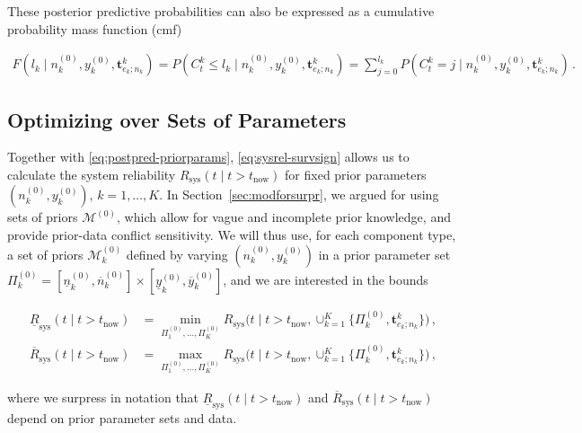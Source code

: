 \documentclass[Journal,SectionNumbers,SingleSpace,InsideFigs]{ascelike}
\renewcommand{\vec}[1]{{\bm#1}}
\newcommand{\uz}{^{(0)}} %
\newcommand{\un}{^{(n)}} %
\newcommand{\ul}[1]{\underline{#1}}
\newcommand{\ol}[1]{\overline{#1}}
\newcommand{\Rsys}{R_\text{sys}}
\newcommand{\lRsys}{\ul{R}_\text{sys}}
\newcommand{\uRsys}{\ol{R}_\text{sys}}
\def\Rsys{R_\text{sys}}
\def\ykz{y\uz_k}
\def\ykzl{\ul{y}\uz_k}
\def\ykzu{\ol{y}\uz_k}
\def\nkz{n\uz_k}
\def\nkn{n\un_k}
\def\nkzl{\ul{n}\uz_k}
\def\nkzu{\ol{n}\uz_k}
\def\MZ{\mathcal{M}\uz}
\def\MkZ{\mathcal{M}\uz_k}
\def\PkZ{\Pi\uz_k}
\newcommand{\PZi}[1]{\Pi\uz_{#1}}
\def\tnow{t_\text{now}}
\begin{document}
%
These posterior predictive probabilities can also be expressed as a cumulative probability mass function (cmf) 
\begin{linenomath*}
\begin{align}
F(l_k \mid \nkz,\ykz,\vec{t}^k_{e_k;n_k}) = P(C^k_t \leq l_k \mid \nkz,\ykz,\vec{t}^k_{e_k;n_k}) 
 = \sum_{j=0}^{l_k} P(C^k_t = j \mid \nkz,\ykz,\vec{t}^k_{e_k;n_k})\,.
\end{align}
\end{linenomath*}


\subsection{Optimizing over Sets of Parameters}
\label{sec:optimize}

Together with \eqref{eq:postpred-priorparams},
\eqref{eq:sysrel-survsign} allows us to calculate the system reliability $\Rsys(t\mid t>\tnow)$
for fixed prior parameters $(\nkz, \ykz)$, $k=1, \ldots, K$.
In Section~\ref{sec:modforsurpr}, we argued for using sets of priors $\MZ$,
which allow for vague and incomplete prior knowledge, and provide prior-data conflict sensitivity.
%
We will thus use, for each component type,
a set of priors $\MkZ$ defined by varying $(\nkz,\ykz)$ in a prior parameter set $\PkZ = [\nkzl,\nkzu] \times [\ykzl,\ykzu]$,
and we are interested in the bounds
\begin{linenomath*}
\begin{align}
\lRsys(t \mid t > \tnow) &= \min_{\PZi{1},\ldots,\PZi{K}} \Rsys\big(t \mid t > \tnow, \cup_{k=1}^K \{\PkZ, \vec{t}^k_{e_k;n_k}\}\big)\,,
\label{eq:lrsysdef}\\
\uRsys(t \mid t > \tnow) &= \max_{\PZi{1},\ldots,\PZi{K}} \Rsys\big(t \mid t > \tnow, \cup_{k=1}^K \{\PkZ, \vec{t}^k_{e_k;n_k}\}\big)\,,
\label{eq:ursysdef}
\end{align}
\end{linenomath*}
where we surpress in notation that $\lRsys(t \mid t > \tnow)$ and $\uRsys(t \mid t > \tnow)$
depend on prior parameter sets and data.
\end{document}
